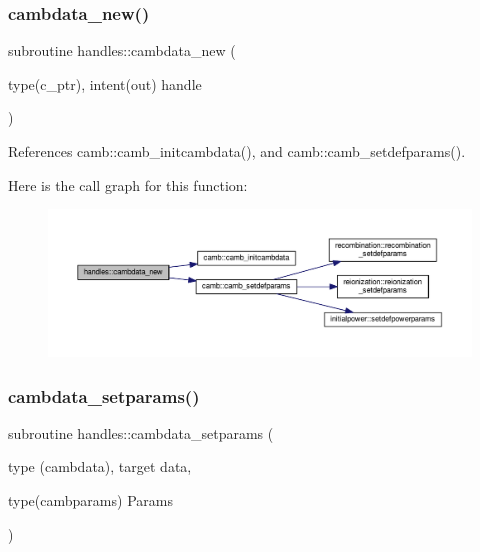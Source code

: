 \mbox{\label{namespacehandles_a4de5423ef5a8e284a0571c62a0144917}} 
\subsubsection{\texorpdfstring{cambdata\+\_\+new()}{cambdata\_new()}}
{\footnotesize\ttfamily subroutine handles\+::cambdata\+\_\+new (\begin{DoxyParamCaption}\item[{type(c\+\_\+ptr), intent(out)}]{handle }\end{DoxyParamCaption})}



References camb\+::camb\+\_\+initcambdata(), and camb\+::camb\+\_\+setdefparams().

Here is the call graph for this function\+:
\nopagebreak
\begin{figure}[H]
\begin{center}
\leavevmode
\includegraphics[width=350pt]{namespacehandles_a4de5423ef5a8e284a0571c62a0144917_cgraph}
\end{center}
\end{figure}
\mbox{\label{namespacehandles_a133fee834b72f96e030cb55f3c47d961}} 
\subsubsection{\texorpdfstring{cambdata\+\_\+setparams()}{cambdata\_setparams()}}
{\footnotesize\ttfamily subroutine handles\+::cambdata\+\_\+setparams (\begin{DoxyParamCaption}\item[{type (cambdata), target}]{data,  }\item[{type(cambparams)}]{Params }\end{DoxyParamCaption})}

